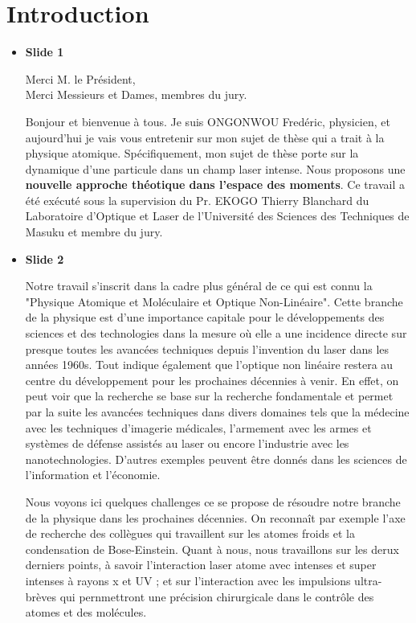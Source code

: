 \documentclass[10pt,a4paper]{article}
\begin{document}
\section{Introduction}

\begin{itemize}
\item \textbf{Slide 1} \par
\noindent Merci M. le Pr\'esident, \\
\noindent Merci Messieurs et Dames, membres du jury. \par
\noindent Bonjour et bienvenue \`a tous.
\noindent Je suis ONGONWOU Fred\'eric, physicien, et aujourd'hui
je vais vous entretenir sur mon sujet de th\`ese 
qui a trait \`a la physique atomique.
Sp\'ecifiquement, mon sujet de th\`ese porte sur la dynamique d'une particule 
dans un champ laser intense.
Nous proposons une \textbf{nouvelle approche th\'eotique 
dans l'espace des moments}. 
Ce travail a \'et\'e ex\'ecut\'e sous la supervision
du Pr. EKOGO Thierry Blanchard du Laboratoire d'Optique et Laser
de l'Universit\'e des Sciences des Techniques de Masuku
et membre du jury.  

\item \textbf{Slide 2} \par
Notre travail s'inscrit dans la cadre plus g\'en\'eral de 
ce qui est connu la "Physique Atomique et Mol\'eculaire et Optique
Non-Lin\'eaire". 
Cette branche de la physique est d'une importance capitale pour 
le d\'eveloppements des sciences et des technologies 
dans la mesure o\`u elle a une incidence directe sur presque toutes 
les avanc\'ees techniques depuis l'invention du laser dans les ann\'ees 
1960s. Tout indique \'egalement que l'optique non lin\'eaire restera 
au centre du d\'eveloppement pour les prochaines d\'ecennies \`a venir.
En effet, on peut voir que la recherche se base sur la recherche fondamentale
et permet par la suite les avanc\'ees techniques dans divers domaines
tels que la m\'edecine avec les techniques d'imagerie m\'edicales,
l'armement avec les armes et syst\`emes de d\'efense assist\'es au laser
ou encore l'industrie avec les nanotechnologies.
D'autres exemples peuvent \^etre donn\'es
dans les sciences de l'information et l'\'economie.

Nous voyons ici quelques challenges ce se propose de r\'esoudre 
notre branche de la physique dans les prochaines d\'ecennies.
On reconna\^it par exemple l'axe de recherche des coll\`egues qui 
travaillent sur les atomes froids et la condensation de Bose-Einstein.
Quant \`a nous, nous travaillons sur les derux derniers points, 
\`a savoir l'interaction laser atome avec intenses et super intenses 
\`a rayons x et UV ; et sur l'interaction avec les impulsions 
ultra-br\`eves qui pernmettront une pr\'ecision chirurgicale 
dans le contr\^ole des atomes et des mol\'ecules.


\end{itemize}
\end{document}
